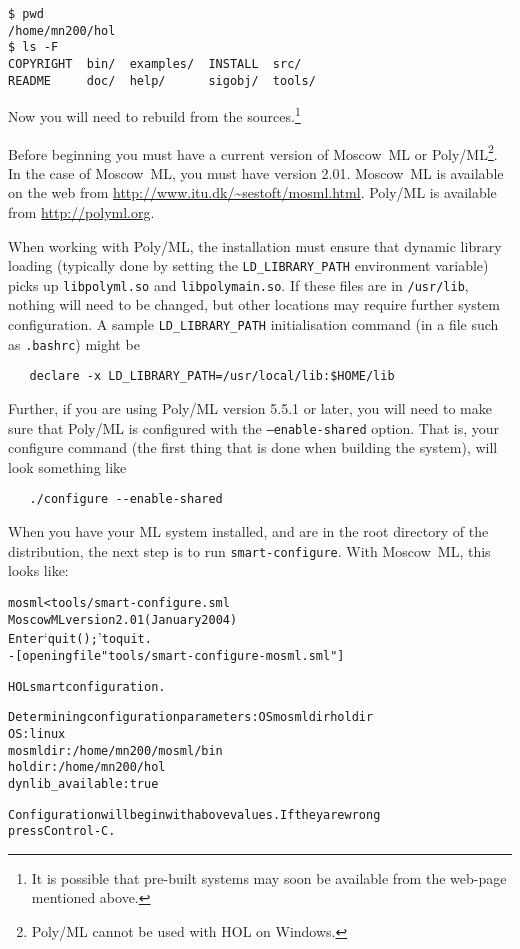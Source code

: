 \setcounter{sessioncount}{0}
\begin{session}
\begin{verbatim}
$ pwd
/home/mn200/hol
$ ls -F
COPYRIGHT  bin/  examples/  INSTALL  src/
README     doc/  help/      sigobj/  tools/
\end{verbatim}
\end{session}

Now you will need to rebuild \HOL{} from the sources.\footnote{It is
  possible that pre-built systems may soon be available from the
  web-page mentioned above.}

Before beginning you must have a current version of Moscow~ML or
Poly/ML\footnote{Poly/ML cannot be used with HOL on Windows.}.  In the
case of Moscow~ML, you must have version 2.01.  Moscow~ML is available
on the web from \url{http://www.itu.dk/~sestoft/mosml.html}.
Poly/ML is available from \url{http://polyml.org}.

When working with Poly/ML, the installation must ensure that dynamic library loading (typically done by setting the \texttt{LD\_LIBRARY\_PATH} environment variable) picks up \texttt{libpolyml.so} and \texttt{libpolymain.so}.
If these files are in \texttt{/usr/lib}, nothing will need to be changed, but other locations may require further system configuration.
A sample \texttt{LD\_LIBRARY\_PATH} initialisation command (in a file such as \texttt{.bashrc}) might be
\begin{verbatim}
   declare -x LD_LIBRARY_PATH=/usr/local/lib:$HOME/lib
\end{verbatim}
Further, if you are using Poly/ML version 5.5.1 or later, you will need to make sure that Poly/ML is configured with the \texttt{--enable-shared} option.
That is, your configure command (the first thing that is done when building the system), will look something like
\begin{verbatim}
   ./configure --enable-shared
\end{verbatim}

When you have your ML system installed, and are in the root directory of the distribution, the next step is to run \texttt{smart-configure}.
With Moscow~ML, this looks like:

\begin{session}
\begin{alltt}
\dol mosml < tools/smart-configure.sml
Moscow ML version 2.01 (January 2004)
Enter `quit();' to quit.
- [opening file "tools/smart-configure-mosml.sml"]

HOL smart configuration.

Determining configuration parameters: OS mosmldir holdir
OS:                 linux
mosmldir:           /home/mn200/mosml/bin
holdir:             /home/mn200/hol
dynlib_available:   true

Configuration will begin with above values.  If they are wrong
press Control-C.
\end{alltt}
\end{session}

